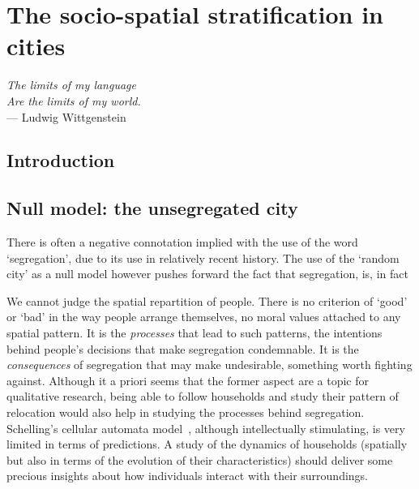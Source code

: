 %
\chapter{The socio-spatial stratification in cities}
\label{sec:concepts}


\begin{flushright}{\slshape    
The limits of my language\\
Are the limits of my world.} \\ \medskip
--- Ludwig Wittgenstein 
\end{flushright}

\section{Introduction}
\label{sec:introduction}

\section{Null model: the unsegregated city}
\label{sec:null_model_the_unsegregated_city}



There is often a negative connotation implied with the use of the word
`segregation', due to its use in relatively recent history. The use of the
`random city' as a null model however pushes forward the fact that segregation,
is, in fact 

We cannot judge the spatial repartition of people. There is no criterion of
`good' or `bad' in the way people arrange themselves, no moral values attached 
to any spatial pattern. It is the \emph{processes} that lead to such
patterns, the intentions behind people's decisions that make segregation
condemnable. It is the \emph{consequences} of segregation that may make
undesirable, something worth fighting against. Although it a priori seems that
the former aspect are a topic for qualitative research, being able to follow
households and study their pattern of relocation would also help in studying
the processes behind segregation. Schelling's cellular automata
model~\cite{Schelling:1971}, although intellectually stimulating, is very
limited in terms of predictions. A study of the dynamics of households
(spatially but also in terms of the evolution of their characteristics) should
deliver some precious insights about how individuals interact with their
surroundings.



